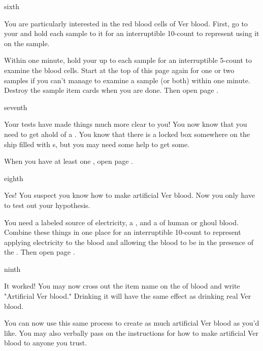 \documentclass[greennotebook]{guildcamp4} %
\begin{document}
\begin{page}{sixth}

You are particularly interested in the red blood cells of Ver blood. First, go to your \sCentrifuge{} and hold each sample to it for an interruptible 10-count to represent using it on the sample.

Within one minute, hold your \iMicroscope{} up to each sample for an interruptible 5-count to examine the blood cells. Start  at the top of this page again for one or two samples if you can't manage to examine a sample (or both) within one minute. Destroy the sample item cards when you are done. Then open page .

\end{page}

\begin{page}{seventh}

Your tests have made things much more clear to you! You now know that you need to get ahold of a \iIsotope{}. You know that there is a locked box somewhere on the ship filled with \iIsotope{}s, but you may need some help to get some.

When you have at least one \iIsotope{}, open page .

\end{page}

\begin{page}{eighth}

Yes! You suspect you know how to make artificial Ver blood. Now you only have to test out your hypothesis.

You need a labeled source of electricity, a \iIsotope{}, and a \iTestTube{} of human or ghoul blood. Combine these things in one place for an interruptible 10-count to represent applying electricity to the blood and allowing the blood to be in the presence of the \iIsotope{}. Then open page .

\end{page}

\begin{page}{ninth}

It worked! You may now cross out the item name on the \iTestTube{} of blood and write "Artificial Ver blood." Drinking it will have the same effect as drinking real Ver blood.

You can now use this same process to create as much artificial Ver blood as you'd like. You may also verbally pass on the instructions for how to make artificial Ver blood to anyone you trust.

\end{page}

\endnotebook
\end{document}
